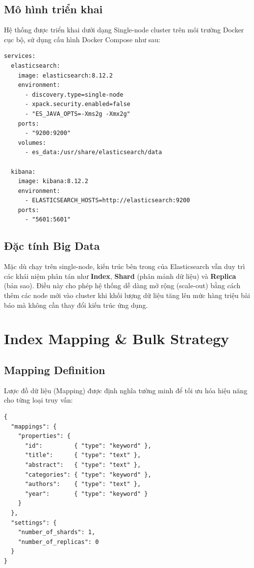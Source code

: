 \subsection{Mô hình triển khai}
Hệ thống được triển khai dưới dạng Single-node cluster trên môi trường Docker cục bộ, sử dụng cấu hình Docker Compose như sau:

\begin{lstlisting}[caption={Docker Compose -- Elasticsearch \& Kibana},label={lst:docker-compose}]
services:
  elasticsearch:
    image: elasticsearch:8.12.2
    environment:
      - discovery.type=single-node
      - xpack.security.enabled=false
      - "ES_JAVA_OPTS=-Xms2g -Xmx2g"
    ports:
      - "9200:9200"
    volumes:
      - es_data:/usr/share/elasticsearch/data

  kibana:
    image: kibana:8.12.2
    environment:
      - ELASTICSEARCH_HOSTS=http://elasticsearch:9200
    ports:
      - "5601:5601"
\end{lstlisting}

\subsection{Đặc tính Big Data}
Mặc dù chạy trên single-node, kiến trúc bên trong của Elasticsearch vẫn duy trì các khái niệm phân tán như \textbf{Index}, \textbf{Shard} (phân mảnh dữ liệu) và \textbf{Replica} (bản sao). Điều này cho phép hệ thống dễ dàng mở rộng (scale-out) bằng cách thêm các node mới vào cluster khi khối lượng dữ liệu tăng lên mức hàng triệu bài báo mà không cần thay đổi kiến trúc ứng dụng.

\section{Index Mapping \& Bulk Strategy}

\subsection{Mapping Definition}
Lược đồ dữ liệu (Mapping) được định nghĩa tường minh để tối ưu hóa hiệu năng cho từng loại truy vấn:

\begin{lstlisting}[caption={Elasticsearch Index Mapping},label={lst:mapping}]
{
  "mappings": {
    "properties": {
      "id":         { "type": "keyword" },
      "title":      { "type": "text" },
      "abstract":   { "type": "text" },
      "categories": { "type": "keyword" },
      "authors":    { "type": "text" },
      "year":       { "type": "keyword" }
    }
  },
  "settings": {
    "number_of_shards": 1,
    "number_of_replicas": 0
  }
}
\end{lstlisting}

